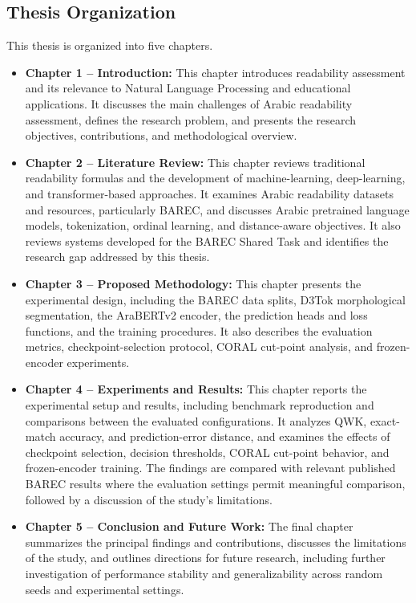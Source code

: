 \documentclass[12pt]{report}
\begin{document}
\subsection{Thesis Organization}
\label{sec:thesis-organization}

This thesis is organized into five chapters.

\begin{itemize}

    \item \textbf{Chapter 1 -- Introduction:}
    This chapter introduces readability assessment and its relevance to Natural Language Processing and educational applications. It discusses the main challenges of Arabic readability assessment, defines the research problem, and presents the research objectives, contributions, and methodological overview.

    \item \textbf{Chapter 2 -- Literature Review:}
    This chapter reviews traditional readability formulas and the development of machine-learning, deep-learning, and transformer-based approaches. It examines Arabic readability datasets and resources, particularly BAREC, and discusses Arabic pretrained language models, tokenization, ordinal learning, and distance-aware objectives. It also reviews systems developed for the BAREC Shared Task and identifies the research gap addressed by this thesis.

    \item \textbf{Chapter 3 -- Proposed Methodology:}
    This chapter presents the experimental design, including the BAREC data splits, D3Tok morphological segmentation, the AraBERTv2 encoder, the prediction heads and loss functions, and the training procedures. It also describes the evaluation metrics, checkpoint-selection protocol, CORAL cut-point analysis, and frozen-encoder experiments.

    \item \textbf{Chapter 4 -- Experiments and Results:}
    This chapter reports the experimental setup and results, including benchmark reproduction and comparisons between the evaluated configurations. It analyzes QWK, exact-match accuracy, and prediction-error distance, and examines the effects of checkpoint selection, decision thresholds, CORAL cut-point behavior, and frozen-encoder training. The findings are compared with relevant published BAREC results where the evaluation settings permit meaningful comparison, followed by a discussion of the study's limitations.

    \item \textbf{Chapter 5 -- Conclusion and Future Work:}
    The final chapter summarizes the principal findings and contributions, discusses the limitations of the study, and outlines directions for future research, including further investigation of performance stability and generalizability across random seeds and experimental settings.

\end{itemize}
\end{document}
